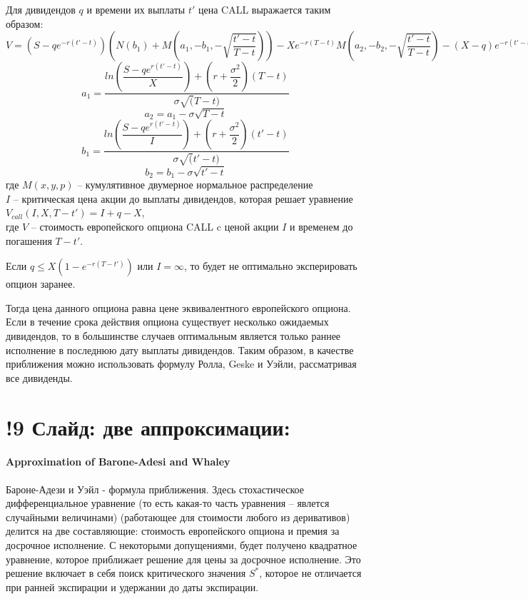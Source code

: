\documentclass[a4paper]{article}
\begin{document}
Для дивидендов $q$ и времени их выплаты $t'$ цена CALL выражается таким образом:
$V = \left(S - qe^{-r (t' - t)} \right) \left( N(b_1) + M \left( a_1, -b_1, - \sqrt{ \dfrac{t' - t}{T - t}} \right) \right) - Xe^{-r (T - t)}  M \left( a_2, -b_2, - \sqrt{\dfrac{t' - t}{T - t}} \right) - (X - q) e^{-r (t' - t)} N(b_2)$
\[a_1 = \dfrac{ln \left( \dfrac{S - qe^{r(t' - t)}}{X}\right) + (r + \dfrac{\sigma^2}{2}) (T-t)}{\sigma \sqrt(T - t)}\]
\[a_2 = a_1 - \sigma \sqrt{T - t}\]
\[b_1 = \dfrac{ln \left( \dfrac{S - qe^{r(t' - t)}}{I}\right) + (r + \dfrac{\sigma^2}{2}) (t'-t)}{\sigma \sqrt(t' - t)}\]
\[b_2 = b_1 - \sigma \sqrt{t' - t}\]
где $M(x,y,p)$ -- кумулятивное двумерное нормальное распределение \\
$I$ -- критическая цена акции до выплаты дивидендов, которая решает уравнение $V_{call} (I, X, T - t') = I + q - X$, \\
где $V$ -- стоимость европейского опциона CALL c ценой акции $I$ и временем до погашения $T - t'$.

Если $q \leq X (1 - e ^{-r (T - t')})$ или $I = \infty$, то будет не оптимально эксперировать опцион заранее.

Тогда цена данного опциона равна цене эквивалентного европейского опциона. Если в течение срока действия опциона существует несколько ожидаемых дивидендов, то в большинстве случаев оптимальным является только раннее исполнение в последнюю дату выплаты дивидендов. Таким образом, в качестве приближения можно использовать формулу Ролла, Geske и Уэйли, рассматривая все дивиденды.
\section*{!9 Слайд: две аппроксимации:}
\paragraph*{Approximation of Barone-Adesi and Whaley}
Бароне-Адези и Уэйл - формула приближения. Здесь стохастическое дифференциальное уравнение (то есть какая-то часть уравнения -- явлется случайными величинами) (работающее для стоимости любого из деривативов) делится на две составляющие: стоимость европейского опциона и премия за досрочное исполнение. С некоторыми допущениями, будет получено квадратное уравнение, которое приближает решение для цены за досрочное исполнение. Это решение включает в себя поиск критического значения $S^*$, которое не отличается при ранней экспирации и удержании до даты экспирации.
\end{document}
